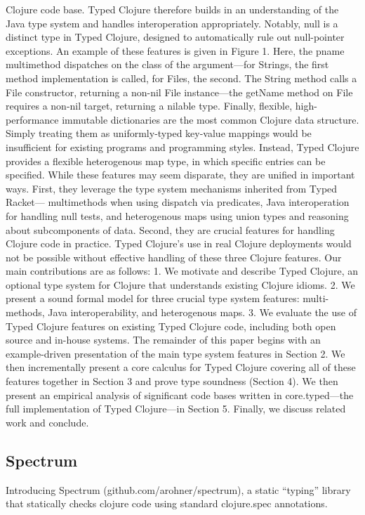 Clojure code base. Typed Clojure therefore builds in an understanding of the
Java type system and handles interoperation appropriately. Notably, null is a
distinct type in Typed Clojure, designed to automatically rule out null-pointer
exceptions. An example of these features is given in Figure 1. Here, the pname
multimethod dispatches on the class of the argument—for Strings, the first
method implementation is called, for Files, the second. The String method calls
a File constructor, returning a non-nil File instance—the getName method on File
requires a non-nil target, returning a nilable type. Finally, flexible,
high-performance immutable dictionaries are the most common Clojure data
structure. Simply treating them as uniformly-typed key-value mappings would be
insufficient for existing programs and programming styles. Instead, Typed
Clojure provides a flexible heterogenous map type, in which specific entries can
be specified. While these features may seem disparate, they are unified in
important ways. First, they leverage the type system mechanisms inherited from
Typed Racket— multimethods when using dispatch via predicates, Java
interoperation for handling null tests, and heterogenous maps using union types
and reasoning about subcomponents of data. Second, they are crucial features for
handling Clojure code in practice. Typed Clojure’s use in real Clojure
deployments would not be possible without effective handling of these three
Clojure features. Our main contributions are as follows: 1. We motivate and
describe Typed Clojure, an optional type system for Clojure that understands
existing Clojure idioms. 2. We present a sound formal model for three crucial
type system features: multi-methods, Java interoperability, and heterogenous
maps. 3. We evaluate the use of Typed Clojure features on existing Typed Clojure
code, including both open source and in-house systems. The remainder of this
paper begins with an example-driven presentation of the main type system
features in Section 2. We then incrementally present a core calculus for Typed
Clojure covering all of these features together in Section 3 and prove type
soundness (Section 4). We then present an empirical analysis of significant code
bases written in core.typed—the full implementation of Typed Clojure—in Section
5. Finally, we discuss related work and conclude.

\subsection{Spectrum}
Introducing Spectrum (github.com/arohner/spectrum), a static “typing”
library that statically checks clojure code using standard clojure.spec
annotations.

